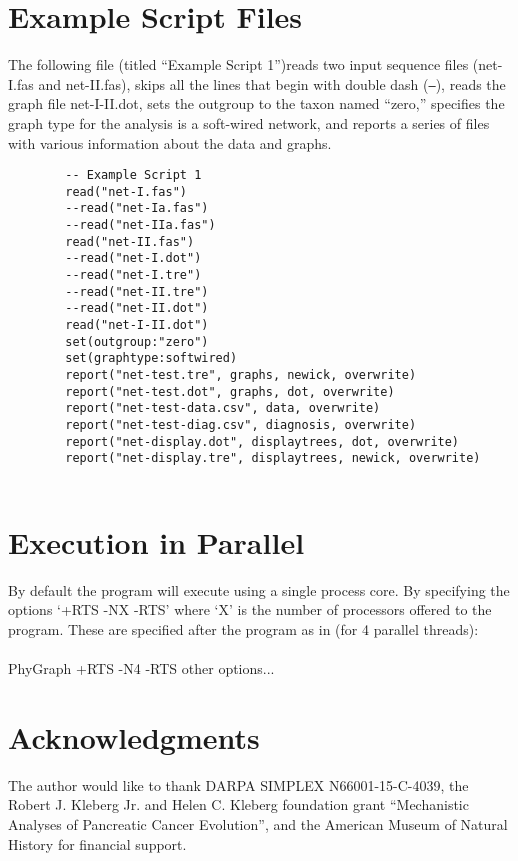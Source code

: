 \documentclass[11pt]{article}
\begin{document}
	\section{Example Script Files}
	The following file (titled ``Example Script 1'')reads two input sequence files (net-I.fas and net-II.fas), skips all the lines that begin with double dash (\texttt{--}),
	reads the graph file net-I-II.dot, sets the outgroup to the taxon named ``zero,'' specifies the graph type for the analysis is a soft-wired network, and
	reports a series of files with various information about the data and graphs.
	\begin{verbatim}
		-- Example Script 1
		read("net-I.fas")
		--read("net-Ia.fas")
		--read("net-IIa.fas")
		read("net-II.fas")
		--read("net-I.dot")
		--read("net-I.tre")
		--read("net-II.tre")
		--read("net-II.dot")
		read("net-I-II.dot")
		set(outgroup:"zero")
		set(graphtype:softwired)
		report("net-test.tre", graphs, newick, overwrite)
		report("net-test.dot", graphs, dot, overwrite)
		report("net-test-data.csv", data, overwrite)
		report("net-test-diag.csv", diagnosis, overwrite)
		report("net-display.dot", displaytrees, dot, overwrite)
		report("net-display.tre", displaytrees, newick, overwrite)
		
	\end{verbatim}
	
	\section{Execution in Parallel}
	By default the program will execute using a single process core.  By specifying the options `+RTS -NX -RTS' where `X' is the number of processors offered to the program. These are specified after the program as in (for 4 parallel threads):\\
	\\
	PhyGraph +RTS -N4 -RTS other options...  \\
	
	\section*{Acknowledgments}
	The author would like to thank DARPA SIMPLEX N66001-15-C-4039, the  Robert J. Kleberg Jr. and Helen C. Kleberg foundation grant ``Mechanistic Analyses of Pancreatic Cancer Evolution'', and the American Museum of Natural History for financial support.  
	
	\newpage
	
\end{document}
